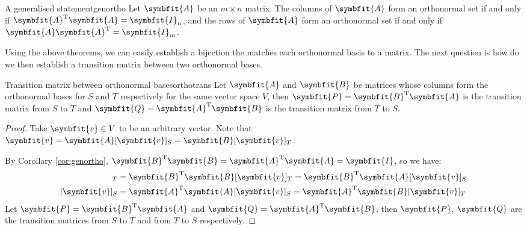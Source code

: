 \documentclass[math]{amznotes}
\theoremstyle{remark}
\begin{document}
\begin{corbox}{A generalised statement}{genortho}
    Let $\symbfit{A}$ be an $m \times n$ matrix. The columns of $\symbfit{A}$ form an orthonormal set if and only if $\symbfit{A}^{\mathrm{T}}\symbfit{A} = \symbfit{I}_n$, and the rows of $\symbfit{A}$ form an orthonormal set if and only if $\symbfit{A}\symbfit{A}^{\mathrm{T}} = \symbfit{I}_m$.
\end{corbox}
Using the above theorems, we can easily establish a bijection the matches each orthonormal basis to a matrix. The next question is how do we then establish a transition matrix between two orthonormal bases.
\begin{thmbox}{Transition matrix between orthonormal bases}{orthotrans}
    Let $\symbfit{A}$ and $\symbfit{B}$ be matrices whose columns form the orthonormal bases for $S$ and $T$ respectively for the same vector space $V$, then $\symbfit{P} = \symbfit{B}^{\mathrm{T}}\symbfit{A}$ is the transition matrix from $S$ to $T$ and $\symbfit{Q} = \symbfit{A}^{\mathrm{T}}\symbfit{B}$ is the transition matrix from $T$ to $S$.
    \tcblower
    \begin{proof}
        Take $\symbfit{v} \in V$ to be an arbitrary vector. Note that $\symbfit{v} = \symbfit{A}[\symbfit{v}]_S = \symbfit{B}[\symbfit{v}]_T$.

        By Corollary \ref{cor:genortho}, $\symbfit{B}^{\mathrm{T}}\symbfit{B} = \symbfit{A}^{\mathrm{T}}\symbfit{A} = \symbfit{I}$, so we have:
        \begin{align*}
            [\symbfit{v}]_T & = \symbfit{B}^{\mathrm{T}}\symbfit{B}[\symbfit{v}]_T = \symbfit{B}^{\mathrm{T}}\symbfit{A}[\symbfit{v}]_S \\
            [\symbfit{v}]_S & = \symbfit{A}^{\mathrm{T}}\symbfit{A}[\symbfit{v}]_S = \symbfit{A}^{\mathrm{T}}\symbfit{B}[\symbfit{v}]_T
        \end{align*}
        Let $\symbfit{P} = \symbfit{B}^{\mathrm{T}}\symbfit{A}$ and $\symbfit{Q} = \symbfit{A}^{\mathrm{T}}\symbfit{B}$, then $\symbfit{P}$, $\symbfit{Q}$ are the transition matrices from $S$ to $T$ and from $T$ to $S$ respectively.
    \end{proof}
\end{thmbox}
\end{document}
